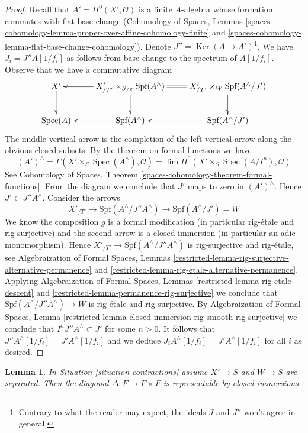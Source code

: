 \documentclass{stacks-project}
\theoremstyle{plain}
\newtheorem{lemma}[subsection]{Lemma}
\theoremstyle{definition}
\theoremstyle{remark}
\numberwithin{equation}{subsection}
\def\lim{\mathop{\mathrm{lim}}\nolimits}
\def\Spec{\mathop{\mathrm{Spec}}}
\def\Ker{\mathop{\mathrm{Ker}}}
\begin{document}
\begin{proof}
\medskip\noindent
Recall that $A' = H^0(X', \mathcal{O})$ is a finite $A$-algebra
whose formation commutes with flat base change
(Cohomology of Spaces, Lemmas
\ref{spaces-cohomology-lemma-proper-over-affine-cohomology-finite} and
\ref{spaces-cohomology-lemma-flat-base-change-cohomology}). Denote
$J'' = \Ker(A \to A')$\footnote{Contrary to what the reader
may expect, the ideals $J$ and $J''$ won't agree in general.}.
We have $J_i = J''A[1/f_i]$ as follows
from base change to the spectrum of $A[1/f_i]$.
Observe that we have a commutative diagram
$$
\xymatrix{
X' \ar[d] &
X'_{/T'} \times_{S_{/Z}} \text{Spf}(A^\wedge) \ar[l] \ar[d] &
X'_{/T'} \times_W \text{Spf}(A^\wedge/J') \ar@{=}[l] \ar[d] \\
\Spec(A) &
\text{Spf}(A^\wedge) \ar[l] &
\text{Spf}(A^\wedge/J') \ar[l]
}
$$
The middle vertical arrow is the completion of the left vertical
arrow along the obvious closed subsets. By the theorem on formal
functions we have
$$
(A')^\wedge = \Gamma(X' \times_S \Spec(A^\wedge), \mathcal{O}) =
\lim H^0(X' \times_S \Spec(A/I^n), \mathcal{O})
$$
See Cohomology of Spaces, Theorem
\ref{spaces-cohomology-theorem-formal-functions}.
From the diagram we conclude that $J'$ maps to zero in $(A')^\wedge$.
Hence $J' \subset J'' A^\wedge$. Consider the arrows
$$
X'_{/T'} \to
\text{Spf}(A^\wedge/J''A^\wedge) \to
\text{Spf}(A^\wedge/J') = W
$$
We know the composition $g$ is a formal modification
(in particular rig-\'etale and rig-surjective) and the second
arrow is a closed immersion (in particular an adic monomorphism).
Hence $X'_{/T'} \to \text{Spf}(A^\wedge/J''A^\wedge)$ is
rig-surjective and rig-\'etale, see
Algebraization of Formal Spaces, Lemmas
\ref{restricted-lemma-rig-surjective-alternative-permanence} and
\ref{restricted-lemma-rig-etale-alternative-permanence}.
Applying Algebraization of Formal Spaces, Lemmas
\ref{restricted-lemma-rig-etale-descent} and
\ref{restricted-lemma-permanence-rig-surjective}
we conclude that $\text{Spf}(A^\wedge/J''A^\wedge) \to W$
is rig-\'etale and rig-surjective.
By Algebraization of Formal Spaces, Lemma
\ref{restricted-lemma-closed-immersion-rig-smooth-rig-surjective}
we conclude that $I^n J'' A^\wedge \subset J'$ for some $n > 0$.
It follows that $J'' A^\wedge[1/f_i] = J' A^\wedge[1/f_i]$ and
we deduce $J_i A^\wedge[1/f_i] = J' A^\wedge[1/f_i]$ for all
$i$ as desired.
\end{proof}

\begin{lemma}
\label{lemma-diagonal-contractions}
In Situation \ref{situation-contractions} assume $X' \to S$
and $W \to S$ are separated. Then the diagonal $\Delta : F \to F \times F$
is representable by closed immersions.
\end{lemma}
\end{document}
